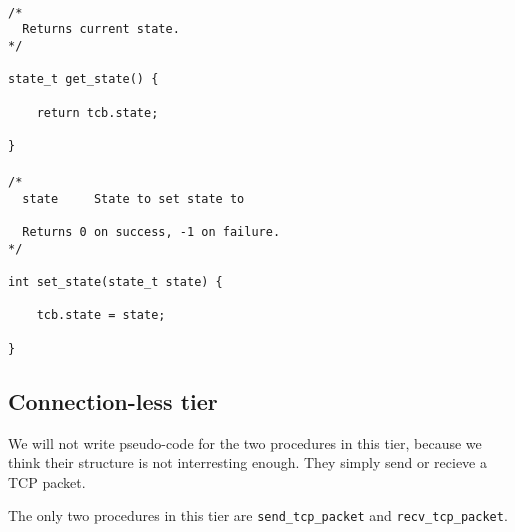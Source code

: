 \documentclass[11pt]{article}
\begin{document}
\paragraph{}


\begin{lstlisting}[title=Procedure get\_state]
/*
  Returns current state.
*/

state_t get_state() {

    return tcb.state;

}
\end{lstlisting}


\paragraph{}


\begin{lstlisting}[title=Procedure set\_state]
/*
  state     State to set state to

  Returns 0 on success, -1 on failure.
*/

int set_state(state_t state) {

    tcb.state = state;

}
\end{lstlisting}


\subsection{Connection-less tier}


We will not write pseudo-code for the two procedures in this tier, because
we think their structure is not interresting enough. They simply send or
recieve a TCP packet.

The only two procedures in this tier are \verb|send_tcp_packet| and
\verb|recv_tcp_packet|.
\end{document}
